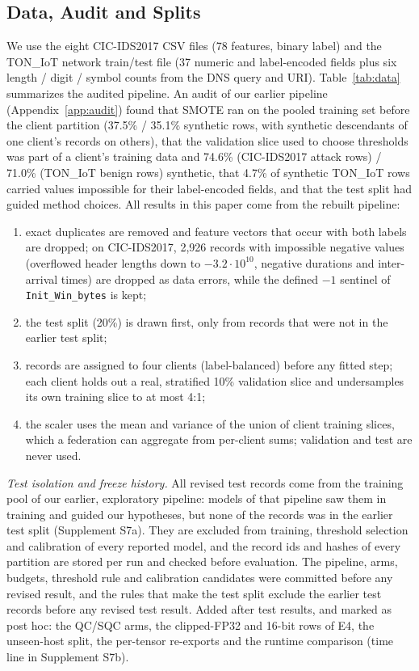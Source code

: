 \documentclass[sigplan,10pt,review,anonymous,nonacm]{acmart}
\newcommand{\cic}{CIC-IDS2017\xspace}
\newcommand{\ton}{TON\_IoT\xspace}
\begin{document}
\subsection{Data, Audit and Splits}\label{sec:data}
We use the eight \cic CSV files (78 features, binary label) and the \ton network train/test file
(37 numeric and label-encoded fields plus six length / digit / symbol counts from the DNS query and
URI). Table~\ref{tab:data} summarizes the audited pipeline. An audit of our earlier pipeline
(Appendix~\ref{app:audit}) found that SMOTE ran on the pooled training set before the client partition
(37.5\% / 35.1\% synthetic rows, with synthetic descendants of one client's records on others), that
the validation slice used to choose thresholds was part of a client's training data and 74.6\% (\cic
attack rows) / 71.0\% (\ton benign rows) synthetic, that 4.7\% of synthetic \ton rows carried values
impossible for their label-encoded fields, and that the test split had guided method choices. All
results in this paper come from the rebuilt pipeline:
\begin{enumerate}
\item exact duplicates are removed and feature vectors that occur with both labels are dropped; on
  \cic, 2,926 records with impossible negative values (overflowed header lengths down to
  $-3.2\cdot10^{10}$, negative durations and inter-arrival times) are dropped as data errors, while
  the defined $-1$ sentinel of \texttt{Init\_Win\_bytes} is kept;
\item the test split (20\%) is drawn first, only from records that were not in the earlier test split;
\item records are assigned to four clients (label-balanced) before any fitted step; each client holds
  out a real, stratified 10\% validation slice and undersamples its own training slice to at most 4:1;
\item the scaler uses the mean and variance of the union of client training slices, which a
  federation can aggregate from per-client sums; validation and test are never used.
\end{enumerate}
\emph{Test isolation and freeze history.} All revised test records come from the training pool of our
earlier, exploratory pipeline: models of that pipeline saw them in training and guided our hypotheses,
but none of the records was in the earlier test split (Supplement S7a). They are excluded from training,
threshold selection and calibration of every reported model, and the record ids and hashes of every
partition are stored per run and checked before evaluation. The pipeline, arms, budgets, threshold rule
and calibration candidates were committed before any revised result, and the rules that make the test
split exclude the earlier test records before any revised test result. Added after test results, and
marked as post hoc: the QC/SQC arms, the clipped-FP32 and 16-bit rows of E4, the unseen-host split, the
per-tensor re-exports and the runtime comparison (time line in Supplement S7b).
\end{document}
